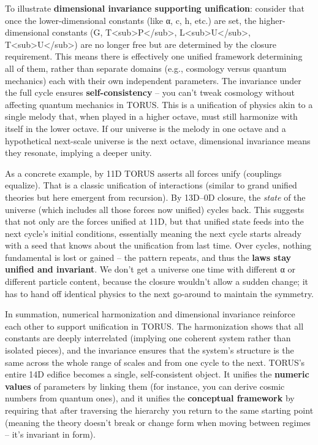 \documentclass[
]{article}
\begin{document}
To illustrate \textbf{dimensional invariance supporting unification}:
consider that once the lower-dimensional constants (like α, c, h, etc.)
are set, the higher-dimensional constants (G,
T\textless sub\textgreater P\textless/sub\textgreater,
L\textless sub\textgreater U\textless/sub\textgreater,
T\textless sub\textgreater U\textless/sub\textgreater) are no longer
free but are determined by the closure requirement\hspace{0pt}. This
means there is effectively one unified framework determining all of
them, rather than separate domains (e.g., cosmology versus quantum
mechanics) each with their own independent parameters. The invariance
under the full cycle ensures \textbf{self-consistency} -- you can't
tweak cosmology without affecting quantum mechanics in TORUS. This is a
unification of physics akin to a single melody that, when played in a
higher octave, must still harmonize with itself in the lower octave. If
our universe is the melody in one octave and a hypothetical next-scale
universe is the next octave, dimensional invariance means they resonate,
implying a deeper unity.

As a concrete example, by 11D TORUS asserts all forces unify (couplings
equalize)\hspace{0pt}. That is a classic unification of interactions
(similar to grand unified theories but here emergent from recursion). By
13D--0D closure, the \emph{state} of the universe (which includes all
those forces now unified) cycles back. This suggests that not only are
the forces unified at 11D, but that unified state feeds into the next
cycle's initial conditions, essentially meaning the next cycle starts
already with a seed that knows about the unification from last time.
Over cycles, nothing fundamental is lost or gained -- the pattern
repeats, and thus the \textbf{laws stay unified and invariant}. We don't
get a universe one time with different α or different particle content,
because the closure wouldn't allow a sudden change; it has to hand off
identical physics to the next go-around to maintain the symmetry.

In summation, numerical harmonization and dimensional invariance
reinforce each other to support unification in TORUS. The harmonization
shows that all constants are deeply interrelated (implying one coherent
system rather than isolated pieces), and the invariance ensures that the
system's structure is the same across the whole range of scales and from
one cycle to the next. TORUS's entire 14D edifice becomes a single,
self-consistent object. It unifies the \textbf{numeric values} of
parameters by linking them (for instance, you can derive cosmic numbers
from quantum ones), and it unifies the \textbf{conceptual framework} by
requiring that after traversing the hierarchy you return to the same
starting point (meaning the theory doesn't break or change form when
moving between regimes -- it's invariant in form).
\end{document}
